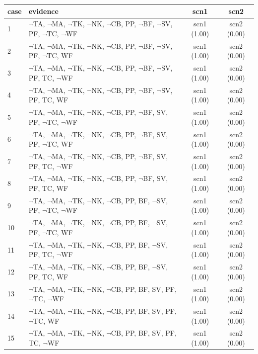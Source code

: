 \documentclass[12pt]{article}
\begin{document}
\begin{longtable}{|l|l|c|c|} 
 \hline 
 case & evidence & scn1 & scn2  \\ 
 \hline 

1 & $\neg$TA, $\neg$MA, $\neg$TK, $\neg$NK, $\neg$CB, PP, $\neg$BF, $\neg$SV, PF, $\neg$TC, $\neg$WF & scn1 (1.00) & scn2 (0.00)\\
2 & $\neg$TA, $\neg$MA, $\neg$TK, $\neg$NK, $\neg$CB, PP, $\neg$BF, $\neg$SV, PF, $\neg$TC, WF & scn1 (1.00) & scn2 (0.00)\\
3 & $\neg$TA, $\neg$MA, $\neg$TK, $\neg$NK, $\neg$CB, PP, $\neg$BF, $\neg$SV, PF, TC, $\neg$WF & scn1 (1.00) & scn2 (0.00)\\
4 & $\neg$TA, $\neg$MA, $\neg$TK, $\neg$NK, $\neg$CB, PP, $\neg$BF, $\neg$SV, PF, TC, WF & scn1 (1.00) & scn2 (0.00)\\
5 & $\neg$TA, $\neg$MA, $\neg$TK, $\neg$NK, $\neg$CB, PP, $\neg$BF, SV, PF, $\neg$TC, $\neg$WF & scn1 (1.00) & scn2 (0.00)\\
6 & $\neg$TA, $\neg$MA, $\neg$TK, $\neg$NK, $\neg$CB, PP, $\neg$BF, SV, PF, $\neg$TC, WF & scn1 (1.00) & scn2 (0.00)\\
7 & $\neg$TA, $\neg$MA, $\neg$TK, $\neg$NK, $\neg$CB, PP, $\neg$BF, SV, PF, TC, $\neg$WF & scn1 (1.00) & scn2 (0.00)\\
8 & $\neg$TA, $\neg$MA, $\neg$TK, $\neg$NK, $\neg$CB, PP, $\neg$BF, SV, PF, TC, WF & scn1 (1.00) & scn2 (0.00)\\
9 & $\neg$TA, $\neg$MA, $\neg$TK, $\neg$NK, $\neg$CB, PP, BF, $\neg$SV, PF, $\neg$TC, $\neg$WF & scn1 (1.00) & scn2 (0.00)\\
10 & $\neg$TA, $\neg$MA, $\neg$TK, $\neg$NK, $\neg$CB, PP, BF, $\neg$SV, PF, $\neg$TC, WF & scn1 (1.00) & scn2 (0.00)\\
11 & $\neg$TA, $\neg$MA, $\neg$TK, $\neg$NK, $\neg$CB, PP, BF, $\neg$SV, PF, TC, $\neg$WF & scn1 (1.00) & scn2 (0.00)\\
12 & $\neg$TA, $\neg$MA, $\neg$TK, $\neg$NK, $\neg$CB, PP, BF, $\neg$SV, PF, TC, WF & scn1 (1.00) & scn2 (0.00)\\
13 & $\neg$TA, $\neg$MA, $\neg$TK, $\neg$NK, $\neg$CB, PP, BF, SV, PF, $\neg$TC, $\neg$WF & scn1 (1.00) & scn2 (0.00)\\
14 & $\neg$TA, $\neg$MA, $\neg$TK, $\neg$NK, $\neg$CB, PP, BF, SV, PF, $\neg$TC, WF & scn1 (1.00) & scn2 (0.00)\\
15 & $\neg$TA, $\neg$MA, $\neg$TK, $\neg$NK, $\neg$CB, PP, BF, SV, PF, TC, $\neg$WF & scn1 (1.00) & scn2 (0.00)\\

\end{longtable}
\end{document}
